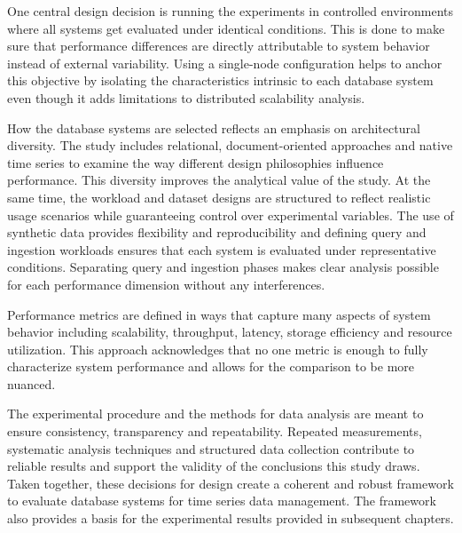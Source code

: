 One central design decision is running the experiments in controlled environments where all systems get evaluated under identical conditions. This is done to make sure that performance differences are directly attributable to system behavior instead of external variability. Using a single-node configuration helps to anchor this objective by isolating the characteristics intrinsic to each database system even though it adds limitations to distributed scalability analysis. 


How the database systems are selected reflects an emphasis on architectural diversity. The study includes relational, document-oriented approaches and native time series to examine the way different design philosophies influence performance. This diversity improves the analytical value of the study. At the same time, the workload and dataset designs are structured to reflect realistic usage scenarios while guaranteeing control over experimental variables. The use of synthetic data provides flexibility and reproducibility and defining query and ingestion workloads ensures that each system is evaluated under representative conditions. Separating query and ingestion phases makes clear analysis possible for each performance dimension without any interferences. 


Performance metrics are defined in ways that capture many aspects of system behavior including scalability, throughput, latency, storage efficiency and resource utilization. This approach acknowledges that no one metric is enough to fully characterize system performance and allows for the comparison to be more nuanced.


The experimental procedure and the methods for data analysis are meant to ensure consistency, transparency and repeatability. Repeated measurements, systematic analysis techniques and structured data collection contribute to reliable results and support the validity of the conclusions this study draws. Taken together, these decisions for design create a coherent and robust framework to evaluate database systems for time series data management. The framework also provides a basis for the experimental results provided in subsequent chapters. 


